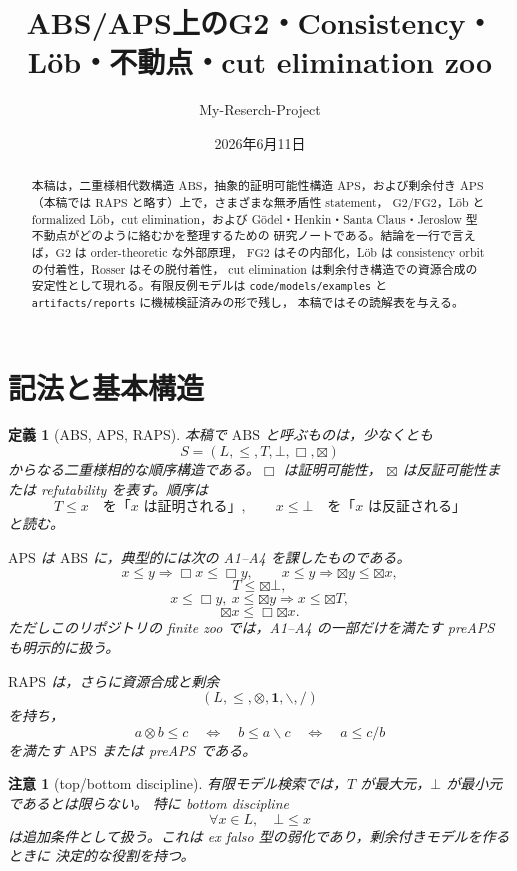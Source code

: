 ﻿\documentclass[a4paper,10pt]{ltjsarticle}
\title{ABS/APS上のG2・Consistency・Löb・不動点・cut elimination zoo}
\author{My-Reserch-Project}
\date{2026年6月11日}
\newtheorem{definition}[theorem]{定義}
\newtheorem{remark}[theorem]{注意}
\newcommand{\ABS}{\mathrm{ABS}}
\newcommand{\APS}{\mathrm{APS}}
\newcommand{\RAPS}{\mathrm{RAPS}}
\newcommand{\Gtwo}{\mathrm{G2}}
\newcommand{\FGtwo}{\mathrm{FG2}}
\newcommand{\Boxop}{\Box}
\newcommand{\Btx}{\boxtimes}
\newcommand{\resl}{\backslash}
\newcommand{\resr}{/}
\newcommand{\Top}{T}
\newcommand{\Bot}{\bot}
\begin{document}
\maketitle

\begin{abstract}
本稿は，二重様相代数構造 \(\ABS\)，抽象的証明可能性構造 \(\APS\)，および剰余付き
\(\APS\)（本稿では \(\RAPS\) と略す）上で，さまざまな無矛盾性 statement，
\(\Gtwo/\FGtwo\)，Löb と formalized Löb，cut elimination，および
Gödel・Henkin・Santa Claus・Jeroslow 型不動点がどのように絡むかを整理するための
研究ノートである。結論を一行で言えば，\(\Gtwo\) は order-theoretic な外部原理，
\(\FGtwo\) はその内部化，Löb は consistency orbit の付着性，Rosser はその脱付着性，
cut elimination は剰余付き構造での資源合成の安定性として現れる。有限反例モデルは
\texttt{code/models/examples} と \texttt{artifacts/reports} に機械検証済みの形で残し，
本稿ではその読解表を与える。
\end{abstract}

\tableofcontents

\section{記法と基本構造}

\begin{definition}[ABS, APS, RAPS]
本稿で \(\ABS\) と呼ぶものは，少なくとも
\[
S=(L,\le,\Top,\Bot,\Boxop,\Btx)
\]
からなる二重様相的な順序構造である。\(\Boxop\) は証明可能性，
\(\Btx\) は反証可能性または refutability を表す。順序は
\[
\Top\le x \quad\text{を「\(x\) は証明される」},\qquad
x\le\Bot \quad\text{を「\(x\) は反証される」}
\]
と読む。

\(\APS\) は \(\ABS\) に，典型的には次の A1--A4 を課したものである。
\[
\tag{A1}
x\le y\Rightarrow \Boxop x\le\Boxop y,\qquad
x\le y\Rightarrow \Btx y\le\Btx x,
\]
\[
\tag{A2}
\Top\le \Btx\Bot,
\]
\[
\tag{A3}
x\le\Boxop y,\ x\le\Btx y\Rightarrow x\le\Btx\Top,
\]
\[
\tag{A4}
\Btx x\le\Boxop\Btx x.
\]
ただしこのリポジトリの finite zoo では，A1--A4 の一部だけを満たす
preAPS も明示的に扱う。

\(\RAPS\) は，さらに資源合成と剰余
\[
(L,\le,\otimes,\mathbf 1,\resl,\resr)
\]
を持ち，
\[
a\otimes b\le c
\quad\Longleftrightarrow\quad
b\le a\resl c
\quad\Longleftrightarrow\quad
a\le c\resr b
\]
を満たす \(\APS\) または preAPS である。
\end{definition}

\begin{remark}[top/bottom discipline]
有限モデル検索では，\(\Top\) が最大元，\(\Bot\) が最小元であるとは限らない。
特に bottom discipline
\[
\forall x\in L,\quad \Bot\le x
\]
は追加条件として扱う。これは ex falso 型の弱化であり，剰余付きモデルを作るときに
決定的な役割を持つ。
\end{remark}
\end{document}

